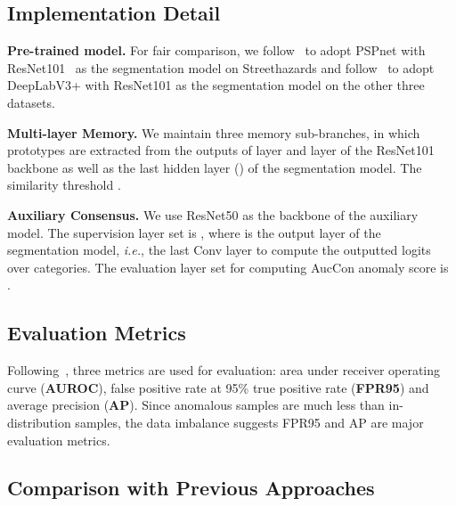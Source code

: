 \documentclass[10pt,twocolumn,letterpaper]{article}
\begin{document}
\subsection{Implementation Detail}
\label{sec:impd}
\noindent\textbf{Pre-trained model.} For fair comparison, we follow~\cite{streethazards,deepmetric,SynthCP} to adopt PSPnet\cite{PSP} with ResNet101~\cite{resnet} as the segmentation model on Streethazards and follow~\cite{synboost}\cite{SML} to adopt DeepLabV3+\cite{deeplabv3plus} with ResNet101 as the segmentation model on the other three datasets.

\noindent\textbf{Multi-layer Memory.} We maintain three memory sub-branches, in which prototypes are extracted from the outputs of  layer and  layer of the ResNet101 backbone as well as the last hidden layer () of the segmentation model. The similarity threshold .



\noindent\textbf{Auxiliary Consensus.} We use ResNet50 as the backbone of the auxiliary model. The supervision layer set is , where  is the output layer of the segmentation model, \emph{i.e.}, the last  Conv layer to compute the outputted logits over categories. The evaluation layer set for computing AucCon anomaly score is .











\subsection{Evaluation Metrics}
Following~\cite{streethazards, SML, SynthCP}, three metrics are used for evaluation: area under receiver operating curve (\textbf{AUROC}), false positive rate at 95\% true positive rate (\textbf{FPR95}) and average precision (\textbf{AP}). Since anomalous samples are much less than in-distribution samples, the data imbalance suggests FPR95 and AP are major evaluation metrics.


\subsection{Comparison with Previous Approaches}
\end{document}
